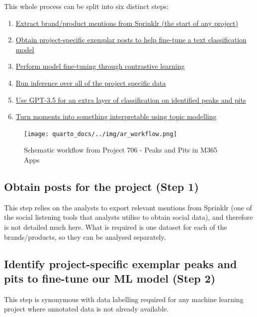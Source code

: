\documentclass[
  letterpaper,
  DIV=11,
  numbers=noendperiod]{scrreprt}
\providecommand{\tightlist}{%
  \setlength{\itemsep}{0pt}\setlength{\parskip}{0pt}}\usepackage{longtable,booktabs,array}
\begin{document}
This whole process can be split into six distinct steps:

\begin{enumerate}
\def\labelenumi{\arabic{enumi}.}
\tightlist
\item
  \hyperref[step-one]{Extract brand/product mentions from Sprinklr (the
  start of any project)}
\item
  \hyperref[step-two]{Obtain project-specific exemplar posts to help
  fine-tune a text classification model}
\item
  \hyperref[step-three]{Perform model fine-tuning through contrastive
  learning}
\item
  \hyperref[step-four]{Run inference over all of the project specific
  data}
\item
  \hyperref[step-five]{Use GPT-3.5 for an extra layer of classification
  on identified peaks and pits}
\item
  \hyperref[step-six]{Turn moments into something interpretable using
  topic modelling}
\end{enumerate}

\begin{figure}[H]

{\centering \texttt{[image: quarto\_docs/../img/ar\_workflow.png]}

}

\caption{Schematic workflow from Project 706 - Peaks and Pits in M365
Apps}

\end{figure}%

\subsection{Obtain posts for the project (Step 1)}\label{step-one}

This step relies on the analysts to export relevant mentions from
Sprinklr (one of the social listening tools that analysts utilise to
obtain social data), and therefore is not detailed much here. What is
required is one dataset for each of the brands/products, so they can be
analysed separately.

\subsection{Identify project-specific exemplar peaks and pits to
fine-tune our ML model (Step 2)}\label{step-two}

This step is synonymous with data labelling required for any machine
learning project where annotated data is not already available.
\end{document}
